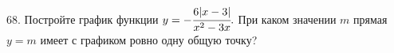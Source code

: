 68. Постройте график функции $y=-\cfrac{6|x-3|}{x^2-3x}.$ При каком значении $m$ прямая $y=m$ имеет с графиком ровно одну общую точку?\\
